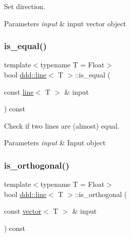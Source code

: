 Set direction. 


\begin{DoxyParams}{Parameters}
{\em input} & input vector object \\
\hline
\end{DoxyParams}
\mbox{\label{classddd_1_1line_aecc0993bff268ebf77fb77665ad003a6}} 
\subsubsection{\texorpdfstring{is\+\_\+equal()}{is\_equal()}}
{\footnotesize\ttfamily template$<$typename T = Float$>$ \\
bool \hyperlink{classddd_1_1line}{ddd\+::line}$<$ T $>$\+::is\+\_\+equal (\begin{DoxyParamCaption}\item[{const \hyperlink{classddd_1_1line}{line}$<$ T $>$ \&}]{input }\end{DoxyParamCaption}) const\hspace{0.3cm}{\ttfamily [inline]}}



Check if two lines are (almost) equal. 


\begin{DoxyParams}{Parameters}
{\em input} & Input object \\
\hline
\end{DoxyParams}
\mbox{\label{classddd_1_1line_a23122dec472048c57ee610ee76ddc6db}} 
\subsubsection{\texorpdfstring{is\+\_\+orthogonal()}{is\_orthogonal()}\hspace{0.1cm}{\footnotesize\ttfamily [1/5]}}
{\footnotesize\ttfamily template$<$typename T = Float$>$ \\
bool \hyperlink{classddd_1_1line}{ddd\+::line}$<$ T $>$\+::is\+\_\+orthogonal (\begin{DoxyParamCaption}\item[{const \hyperlink{classddd_1_1vector}{vector}$<$ T $>$ \&}]{input }\end{DoxyParamCaption}) const\hspace{0.3cm}{\ttfamily [inline]}}



